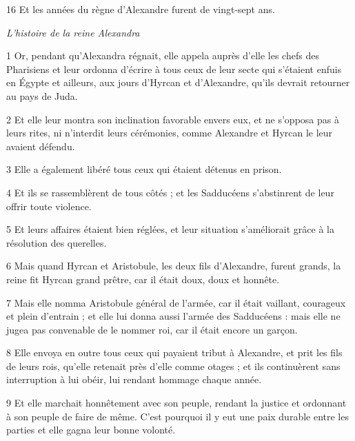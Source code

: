 \par 16 Et les années du règne d'Alexandre furent de vingt-sept ans.


\par \textit{L'histoire de la reine Alexandra}

\par 1 Or, pendant qu'Alexandra régnait, elle appela auprès d'elle les chefs des Pharisiens et leur ordonna d'écrire à tous ceux de leur secte qui s'étaient enfuis en Égypte et ailleurs, aux jours d'Hyrcan et d'Alexandre, qu'ils devrait retourner au pays de Juda.

\par 2 Et elle leur montra son inclination favorable envers eux, et ne s'opposa pas à leurs rites, ni n'interdit leurs cérémonies, comme Alexandre et Hyrcan le leur avaient défendu.

\par 3 Elle a également libéré tous ceux qui étaient détenus en prison.

\par 4 Et ils se rassemblèrent de tous côtés ; et les Sadducéens s'abstinrent de leur offrir toute violence.

\par 5 Et leurs affaires étaient bien réglées, et leur situation s'améliorait grâce à la résolution des querelles.

\par 6 Mais quand Hyrcan et Aristobule, les deux fils d'Alexandre, furent grands, la reine fit Hyrcan grand prêtre, car il était doux, doux et honnête.

\par 7 Mais elle nomma Aristobule général de l'armée, car il était vaillant, courageux et plein d'entrain ; et elle lui donna aussi l'armée des Sadducéens : mais elle ne jugea pas convenable de le nommer roi, car il était encore un garçon.

\par 8 Elle envoya en outre tous ceux qui payaient tribut à Alexandre, et prit les fils de leurs rois, qu'elle retenait près d'elle comme otages ; et ils continuèrent sans interruption à lui obéir, lui rendant hommage chaque année.

\par 9 Et elle marchait honnêtement avec son peuple, rendant la justice et ordonnant à son peuple de faire de même. C'est pourquoi il y eut une paix durable entre les parties et elle gagna leur bonne volonté.

